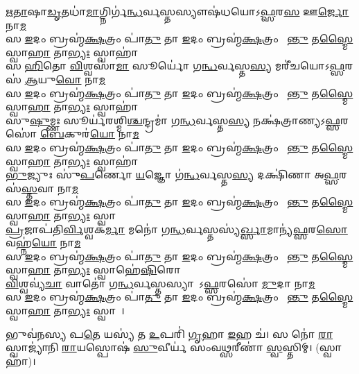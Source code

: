 \ul{𑌋}\ul{𑌤𑌾}𑌷𑌾\ul{𑌡𑍃}𑌤𑌧𑌾॑\ul{𑌮𑌾}𑌗𑍍𑌨𑌿𑌰𑍍𑌗॑\ul{𑌨𑍍𑌧}𑌰𑍍𑌵𑌸𑍍𑌤𑌸𑍍𑌯𑍗𑌷॑𑌧𑌯𑍋𑌽\ul{𑌫𑍍𑌸}𑌰\ul{𑌸} 𑌊\ul{𑌰𑍍𑌜𑍋} 𑌨𑌾\ul{𑌮}\\
𑌸 \ul{𑌇}𑌦𑌂 𑌬𑍍𑌰𑌹𑍍𑌮॑\ul{𑌕𑍍𑌷}𑌤𑍍𑌰𑌂 𑌪𑌾॑\ul{𑌤𑍁} 𑌤𑌾 \ul{𑌇}𑌦𑌂 𑌬𑍍𑌰𑌹𑍍𑌮॑\ul{𑌕𑍍𑌷}𑌤𑍍𑌰𑌂 𑌪𑌾᳚\ul{𑌨𑍍𑌤𑍁} 𑌤\ul{𑌸𑍍𑌮𑍈} 𑌸𑍍𑌵𑌾\ul{𑌹𑌾} 𑌤𑌾\ul{𑌭𑍍𑌯𑌃} 𑌸𑍍𑌵𑌾𑌹𑌾॑\\
𑌸\ul{𑌹𑌿}𑌤𑍋 \ul{𑌵𑌿}𑌶𑍍𑌵𑌸𑌾॑\ul{𑌮𑌾} 𑌸𑍂𑌰𑍍𑌯𑍋॑ 𑌗\ul{𑌨𑍍𑌧}𑌰𑍍𑌵𑌸𑍍𑌤\ul{𑌸𑍍𑌯} 𑌮𑌰𑍀॑𑌚𑌯𑍋𑌽\ul{𑌫𑍍𑌸}𑌰𑌸॑ \ul{𑌆}𑌯𑍁\ul{𑌵𑍋} 𑌨𑌾\ul{𑌮}\\
𑌸 \ul{𑌇}𑌦𑌂 𑌬𑍍𑌰𑌹𑍍𑌮॑\ul{𑌕𑍍𑌷}𑌤𑍍𑌰𑌂 𑌪𑌾॑\ul{𑌤𑍁} 𑌤𑌾 \ul{𑌇}𑌦𑌂 𑌬𑍍𑌰𑌹𑍍𑌮॑\ul{𑌕𑍍𑌷}𑌤𑍍𑌰𑌂 𑌪𑌾᳚\ul{𑌨𑍍𑌤𑍁} 𑌤\ul{𑌸𑍍𑌮𑍈} 𑌸𑍍𑌵𑌾\ul{𑌹𑌾} 𑌤𑌾\ul{𑌭𑍍𑌯𑌃} 𑌸𑍍𑌵𑌾𑌹𑌾॑\\
𑌸𑍁\ul{𑌷𑍁}𑌮𑍍𑌣𑌃 𑌸𑍂𑌰𑍍𑌯॑𑌰𑌶𑍍𑌮𑌿\ul{𑌶𑍍𑌚}𑌨𑍍𑌦𑍍𑌰𑌮𑌾॑ 𑌗\ul{𑌨𑍍𑌧}𑌰𑍍𑌵𑌸𑍍𑌤\ul{𑌸𑍍𑌯} 𑌨𑌕𑍍𑌷॑𑌤𑍍𑌰𑌾𑌣𑍍𑌯𑌽\ul{𑌫𑍍𑌸}𑌰𑌸𑍋॑ \ul{𑌬𑍇}𑌕𑍁𑌰॑\ul{𑌯𑍋} 𑌨𑌾\ul{𑌮}\\
𑌸 \ul{𑌇}𑌦𑌂 𑌬𑍍𑌰𑌹𑍍𑌮॑\ul{𑌕𑍍𑌷}𑌤𑍍𑌰𑌂 𑌪𑌾॑\ul{𑌤𑍁} 𑌤𑌾 \ul{𑌇}𑌦𑌂 𑌬𑍍𑌰𑌹𑍍𑌮॑\ul{𑌕𑍍𑌷}𑌤𑍍𑌰𑌂 𑌪𑌾᳚\ul{𑌨𑍍𑌤𑍁} 𑌤\ul{𑌸𑍍𑌮𑍈} 𑌸𑍍𑌵𑌾\ul{𑌹𑌾} 𑌤𑌾\ul{𑌭𑍍𑌯𑌃} 𑌸𑍍𑌵𑌾𑌹𑌾॑\\
\ul{𑌭𑍁}𑌜𑍍𑌯𑍁𑌃 𑌸𑍁𑍁॑\ul{𑌪}𑌰𑍍𑌣𑍋 \ul{𑌯}𑌜𑍍𑌞𑍋 𑌗॑\ul{𑌨𑍍𑌧}𑌰𑍍𑌵𑌸𑍍𑌤\ul{𑌸𑍍𑌯} 𑌦𑌕𑍍𑌷𑌿॑𑌣𑌾 𑌅\ul{𑌫𑍍𑌸}𑌰𑌸॑\ul{𑌸𑍍𑌤}𑌵𑌾 𑌨𑌾\ul{𑌮}\\
𑌸 \ul{𑌇}𑌦𑌂 𑌬𑍍𑌰𑌹𑍍𑌮॑\ul{𑌕𑍍𑌷}𑌤𑍍𑌰𑌂 𑌪𑌾॑\ul{𑌤𑍁} 𑌤𑌾 \ul{𑌇}𑌦𑌂 𑌬𑍍𑌰𑌹𑍍𑌮॑\ul{𑌕𑍍𑌷}𑌤𑍍𑌰𑌂 𑌪𑌾᳚\ul{𑌨𑍍𑌤𑍁} 𑌤\ul{𑌸𑍍𑌮𑍈} 𑌸𑍍𑌵𑌾\ul{𑌹𑌾} 𑌤𑌾\ul{𑌭𑍍𑌯𑌃} 𑌸𑍍𑌵𑌾𑌹𑌾᳚\\
\ul{𑌪𑍍𑌰}𑌜𑌾𑌪॑𑌤𑌿\ul{𑌰𑍍𑌵𑌿}𑌶𑍍𑌵𑌕॑\ul{𑌰𑍍𑌮𑌾} 𑌮𑌨𑍋॑ 𑌗\ul{𑌨𑍍𑌧}𑌰𑍍𑌵𑌸𑍍𑌤𑌸𑍍𑌯॑\ul{𑌰𑍍𑌖𑍍𑌸𑌾}𑌮𑌾𑌨𑍍𑌯॑\ul{𑌫𑍍𑌸}𑌰\ul{𑌸𑍋} 𑌵𑌹𑍍𑌨॑\ul{𑌯𑍋}  𑌨𑌾\ul{𑌮}\\
𑌸 \ul{𑌇}𑌦𑌂 𑌬𑍍𑌰𑌹𑍍𑌮॑\ul{𑌕𑍍𑌷}𑌤𑍍𑌰𑌂 𑌪𑌾॑\ul{𑌤𑍁} 𑌤𑌾 \ul{𑌇}𑌦𑌂 𑌬𑍍𑌰𑌹𑍍𑌮॑\ul{𑌕𑍍𑌷}𑌤𑍍𑌰𑌂 𑌪𑌾᳚\ul{𑌨𑍍𑌤𑍁} 𑌤\ul{𑌸𑍍𑌮𑍈} 𑌸𑍍𑌵𑌾\ul{𑌹𑌾} 𑌤𑌾\ul{𑌭𑍍𑌯𑌃} 𑌸𑍍𑌵𑌾𑌹𑍇॑\ul{𑌷𑌿}𑌰𑍋\\
\ul{𑌵𑌿}𑌶𑍍𑌵𑌵𑍍𑌯॑\ul{𑌚𑌾} 𑌵𑌾𑌤𑍋॑ 𑌗\ul{𑌨𑍍𑌧}𑌰𑍍𑌵𑌸𑍍𑌤𑌸𑍍𑌯𑌾𑌪𑍋᳚𑌽\ul{𑌫𑍍𑌸}𑌰𑌸𑍋॑ \ul{𑌮𑍁}𑌦𑌾 𑌨𑌾\ul{𑌮}\\
𑌸 \ul{𑌇}𑌦𑌂 𑌬𑍍𑌰𑌹𑍍𑌮॑\ul{𑌕𑍍𑌷}𑌤𑍍𑌰𑌂 𑌪𑌾॑\ul{𑌤𑍁} 𑌤𑌾 \ul{𑌇}𑌦𑌂 𑌬𑍍𑌰𑌹𑍍𑌮॑\ul{𑌕𑍍𑌷}𑌤𑍍𑌰𑌂 𑌪𑌾᳚\ul{𑌨𑍍𑌤𑍁} 𑌤\ul{𑌸𑍍𑌮𑍈} 𑌸𑍍𑌵𑌾\ul{𑌹𑌾} 𑌤𑌾\ul{𑌭𑍍𑌯𑌃} 𑌸𑍍𑌵𑌾𑌹𑌾᳚।

𑌭𑍁𑌵॑𑌨𑌸𑍍𑌯 𑌪\ul{𑌤𑍇} 𑌯𑌸𑍍𑌯॑ 𑌤 \ul{𑌉}𑌪𑌰𑌿॑ \ul{𑌗𑍃}𑌹𑌾 \ul{𑌇}𑌹 𑌚॑।
𑌸 𑌨𑍋॑ \ul{𑌰𑌾}𑌸𑍍𑌵𑌾𑌜𑍍𑌯𑌾॑𑌨𑌿 \ul{𑌰𑌾}𑌯𑌸𑍍𑌪𑍋𑌷॑ \ul{𑌸𑍁}𑌵𑍀𑌰𑍍𑌯॑ 𑌸𑌂𑌵\ul{𑌥𑍍𑌸}𑌰𑍀𑌣𑌾॑ \ul{𑌸𑍍𑌵}𑌸𑍍𑌤𑌿𑌮𑍍। (𑌸𑍍𑌵𑌾𑌹𑌾॑)।

